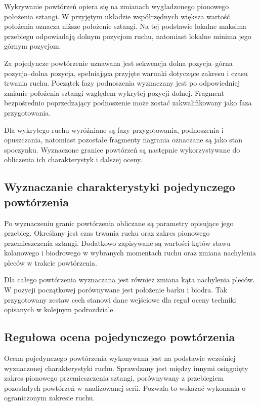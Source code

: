 Wykrywanie powtórzeń opiera się na zmianach wygładzonego pionowego położenia sztangi. W przyjętym układzie współrzędnych większa wartość położenia oznacza niższe położenie sztangi. Na tej podstawie lokalne maksima przebiegu odpowiadają dolnym pozycjom ruchu, natomiast lokalne minima jego górnym pozycjom.

Za pojedyncze powtórzenie uznawana jest sekwencja dolna pozycja--górna pozycja--dolna pozycja, spełniająca przyjęte warunki dotyczące zakresu i czasu trwania ruchu. Początek fazy podnoszenia wyznaczany jest po odpowiedniej zmianie położenia sztangi względem wykrytej pozycji dolnej. Fragment bezpośrednio poprzedzający podnoszenie może zostać zakwalifikowany jako faza przygotowania.

Dla wykrytego ruchu wyróżniane są fazy przygotowania, podnoszenia i opuszczania, natomiast pozostałe fragmenty nagrania oznaczane są jako stan spoczynku. Wyznaczone granice powtórzeń są następnie wykorzystywane do obliczenia ich charakterystyk i dalszej oceny.

\subsection{Wyznaczanie charakterystyki pojedynczego powtórzenia}

Po wyznaczeniu granic powtórzenia obliczane są parametry opisujące jego przebieg. Określany jest czas trwania ruchu oraz zakres pionowego przemieszczenia sztangi. Dodatkowo zapisywane są wartości kątów stawu kolanowego i biodrowego w wybranych momentach ruchu oraz zmiana nachylenia pleców w trakcie powtórzenia.

Dla całego powtórzenia wyznaczana jest również zmiana kąta nachylenia pleców. W pozycji początkowej porównywane jest położenie barku i biodra. Tak przygotowany zestaw cech stanowi dane wejściowe dla reguł oceny techniki opisanych w kolejnym podrozdziale.

\subsection{Regułowa ocena pojedynczego powtórzenia}

Ocena pojedynczego powtórzenia wykonywana jest na podstawie wcześniej wyznaczonej charakterystyki ruchu. Sprawdzany jest między innymi osiągnięty zakres pionowego przemieszczenia sztangi, porównywany z przebiegiem pozostałych powtórzeń w analizowanej serii. Pozwala to wskazać wykonania o ograniczonym zakresie ruchu.


